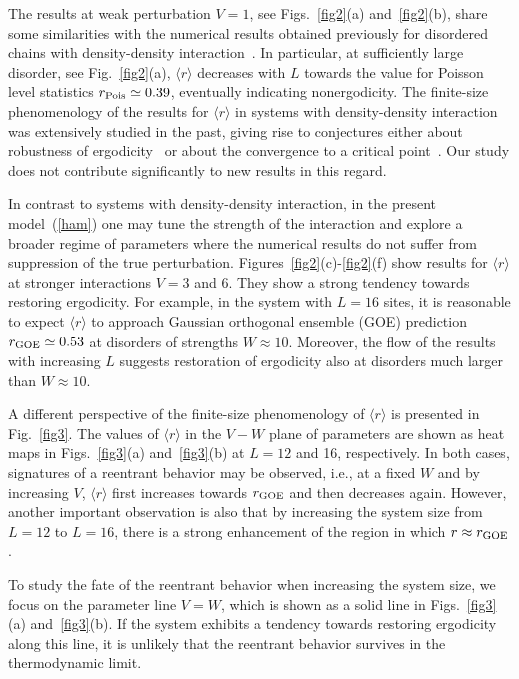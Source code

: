 \documentclass[twocolumn,pre,superscriptaddress,10pt,aps,floatfix]{revtex4-1}
\begin{document}
The results at weak perturbation $V=1$, see Figs.~\ref{fig2}(a) and~\ref{fig2}(b), share some similarities with the numerical results obtained previously for disordered chains with density-density interaction~\cite{luitz15,bertrand_garcia_16,Husex2017, suntajs_2020, sierant_lewenstein_20}.
In particular, at sufficiently large disorder, see Fig.~\ref{fig2}(a), $\langle r \rangle$ decreases with $L$ towards the value for Poisson level statistics $r_{\rm Pois}\simeq 0.39$, eventually indicating nonergodicity.
The finite-size phenomenology of the results for $\langle r \rangle$ in systems with density-density interaction was extensively studied in the past, giving rise to conjectures either about robustness of ergodicity~\cite{suntajs_2020} or about the convergence to a critical point~\cite{sierant_lewenstein_20}.
Our study does not contribute significantly to new results in this regard.

In contrast to systems with density-density interaction, in the present model~(\ref{ham}) one may tune the strength of the interaction and explore a broader regime of parameters where the numerical results do not suffer from suppression of the true perturbation.  
Figures~\ref{fig2}(c)-\ref{fig2}(f) show results for $\langle r \rangle$ at stronger interactions $V=3$ and 6. 
They show a strong tendency towards restoring ergodicity.
For example, in the system with $L=16$ sites, it is reasonable to expect $\langle r \rangle$ to approach Gaussian orthogonal ensemble (GOE) prediction $r_{\rm GOE}\simeq 0.53$ at disorders of strengths $W \approx 10$.
Moreover, the flow of the results with increasing $L$ suggests restoration of ergodicity also at disorders much larger than $W \approx 10$.

A different perspective of the finite-size phenomenology of $\langle r \rangle$ is presented in Fig.~\ref{fig3}.
The values of $\langle r \rangle$ in the $V-W$ plane of parameters are shown as heat maps in Figs.~\ref{fig3}(a) and~\ref{fig3}(b) at $L=12$ and 16, respectively.
In both cases, signatures of a reentrant behavior may be observed, i.e., at a fixed $W$ and by increasing $V$, $\langle r \rangle$ first increases towards $r_{\rm GOE}$ and then decreases again.
However, another important observation is also that by increasing the system size from $L=12$ to $L=16$, there is a strong enhancement of the region in which $r \approx r_{\rm GOE}$.

To study the fate of the reentrant behavior when increasing the system size, we focus on the parameter line $V=W$, which is shown as a solid line in Figs.~\ref{fig3}(a) and~\ref{fig3}(b).
If the system exhibits a tendency towards restoring ergodicity along this line, it is unlikely that the reentrant behavior survives in the thermodynamic limit.
\end{document}
